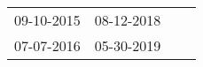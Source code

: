 \begin{supertabular}{llll}
 09-10-2015 &  08-12-2018 \\
 07-07-2016 &  05-30-2019 \\
\end{supertabular}
